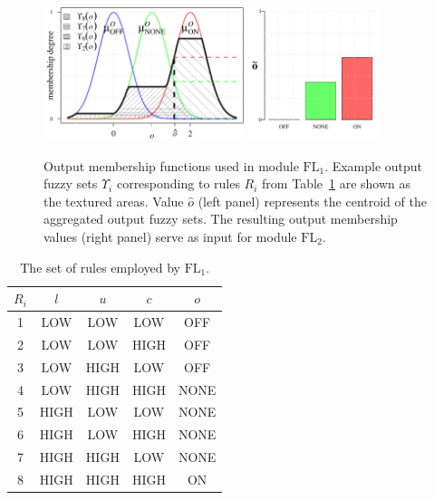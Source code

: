 \begin{figure}[!t]
	\centering
	\includegraphics[height=10.5em]{beta_1}%
	\includegraphics[height=10.5em]{beta_2}
	\caption{Output membership functions used in module $\mathrm{FL}_{1}$. Example output fuzzy sets $\Upsilon_{\!i}$ corresponding to rules $R_i$ from Table~\ref{tab:rules-FL1} are shown as the textured areas. Value $\hat{o}$ (left panel) represents the centroid of the aggregated output fuzzy sets. The resulting output membership values (right panel) serve as input for module $\mathrm{FL}_{2}$.}
	\label{fig9}
\end{figure}

\begin{table}[!t]
	\caption{The set of rules employed by $\mathrm{FL}_{1}$.}
	\label{tab:rules-FL1}
	\centering
	\begin{tabular}{c | c c c | c }
		$R_{i}$ & $l$ & $u$ & $c$ & $o$ \\
		\hline
		1 & LOW  & LOW  & LOW  & OFF \\
		2 & LOW  & LOW  & HIGH & OFF \\
		3 & LOW  & HIGH & LOW  & OFF \\
		\hline
		4 & LOW  & HIGH & HIGH  & NONE \\ 
		5 & HIGH & LOW  & LOW   & NONE \\ 
		6 & HIGH & LOW  & HIGH  & NONE \\ 
		7 & HIGH & HIGH & LOW   & NONE \\ 
		\hline
		8 & HIGH & HIGH & HIGH  & ON \\ 
	\end{tabular}
\end{table}

